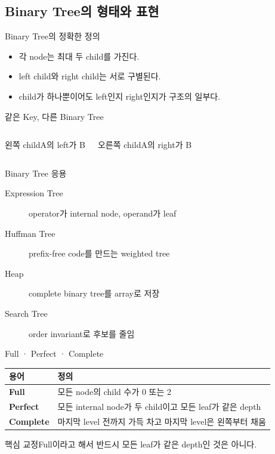 \subsection{Binary Tree의 형태와 표현}
\begin{frame}{Binary Tree의 정확한 정의}
\begin{itemize}
\item 각 node는 최대 두 child를 가진다.
\item left child와 right child는 서로 구별된다.
\item child가 하나뿐이어도 left인지 right인지가 구조의 일부다.
\end{itemize}
\end{frame}
\begin{frame}{같은 Key, 다른 Binary Tree}
\begin{columns}\centering
{}
\begin{block}{왼쪽 child}A의 left가 B\end{block}
\centering
{}
\begin{block}{오른쪽 child}A의 right가 B\end{block}
\end{columns}
\end{frame}
\begin{frame}{Binary Tree 응용}
\begin{description}
\item[Expression Tree] operator가 internal node, operand가 leaf
\item[Huffman Tree] prefix-free code를 만드는 weighted tree
\item[Heap] complete binary tree를 array로 저장
\item[Search Tree] order invariant로 후보를 줄임
\end{description}
\end{frame}
\begin{frame}{Full · Perfect · Complete}
\small\begin{tabular}{>{\bfseries}p{}p{}}\toprule
용어&정의\\\midrule
Full&모든 node의 child 수가 0 또는 2\\
Perfect&모든 internal node가 두 child이고 모든 leaf가 같은 depth\\
Complete&마지막 level 전까지 가득 차고 마지막 level은 왼쪽부터 채움\\\bottomrule
\end{tabular}
\begin{alertblock}{핵심 교정}Full이라고 해서 반드시 모든 leaf가 같은 depth인 것은 아니다.\end{alertblock}
\end{frame}
